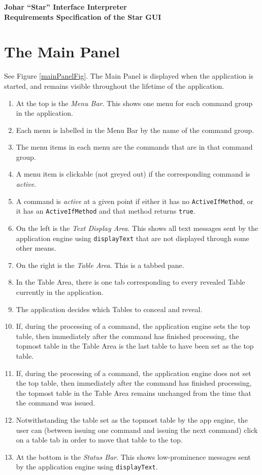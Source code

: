 \documentclass[11pt]{article}
\begin{document}
\begin{center} \bf \Large
Johar ``Star'' Interface Interpreter \\
Requirements Specification of the Star GUI
\end{center}

\section{The Main Panel}

See Figure \ref{mainPanelFig}.  The Main Panel is displayed when the
application is started, and remains visible throughout the lifetime of the
application.
\begin{enumerate}
\item At the top is the {\it Menu Bar}.  This shows one menu
  for each command group in the application.
\item Each menu is labelled in the Menu Bar by the name of the
  command group.
\item The menu items in each menu are the commands that are in
  that command group.
\item A menu item is clickable (not greyed out) if the corresponding
  command is {\it active}.
\item A command is {\it active} at a given point if either it has no
  {\tt ActiveIfMethod}, or it has an {\tt ActiveIfMethod} and that
  method returns {\tt true}.
\item On the left is the {\it Text Display Area}.  This shows all
  text messages sent by the application engine using {\tt displayText}
  that are not displayed through some other means.
\item On the right is the {\it Table Area}.  This is a tabbed pane.
\item In the Table Area, there is one tab corresponding to every
  revealed Table currently in the application.
\item The application decides which Tables to conceal and reveal.
\item If, during the processing of a command, the application engine sets
  the top table, then immediately after the command has finished
  processing, the topmost table in the Table Area is the last table to
  have been set as the top table.
\item If, during the processing of a command, the application engine
  does not set the top table, then immediately
  after the command has finished processing, the topmost table in the
  Table Area remains unchanged from the time that the command was issued.
\item Notwithstanding the table set as the topmost table by the app
  engine, the user can (between issuing one command and issuing the
  next command) click on a table tab in order to move that table to
  the top.
\item At the bottom is the {\it Status Bar}.  This shows low-prominence
  messages sent by the application engine using {\tt displayText}.
\end{enumerate}
\end{document}
